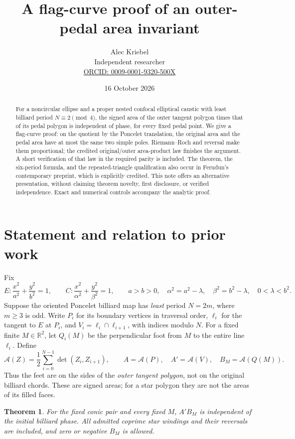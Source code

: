 \documentclass[11pt]{article}
\title{A flag-curve proof of an outer-pedal area invariant}
\author{Alec Kriebel\\
\small Independent researcher\\
\small \href{https://orcid.org/0009-0001-9320-500X}{ORCID: 0009-0001-9320-500X}}
\date{16 October 2026}
\newtheorem{theorem}{Theorem}
\newcommand{\area}{\mathcal A}
\newcommand{\RR}{\mathbb R}
\begin{document}
\maketitle
\begin{abstract}
For a noncircular ellipse and a proper nested confocal elliptical caustic with
least billiard period \(N\equiv2\pmod4\), the signed area of the outer tangent
polygon times that of its pedal polygon is independent of phase, for every
fixed pedal point. We give a flag-curve proof: on the quotient by the
Poncelet translation, the original area and the pedal area have at most the
same two simple poles. Riemann--Roch and reversal make them proportional;
the credited original/outer area-product law finishes the argument.
A short verification of that law in the required parity is included.
The theorem, the six-period formula, and the repeated-triangle qualification
also occur in Ferudun's contemporary preprint, which is explicitly credited.
This note offers an alternative presentation, without claiming theorem
novelty, first disclosure, or verified independence. Exact and numerical
controls accompany the analytic proof.
\end{abstract}

\section{Statement and relation to prior work}
Fix
\[
 E:\frac{x^2}{a^2}+\frac{y^2}{b^2}=1,\qquad
 C:\frac{x^2}{\alpha^2}+\frac{y^2}{\beta^2}=1,\qquad
 a>b>0,\quad \alpha^2=a^2-\lambda,\quad\beta^2=b^2-\lambda,\quad
 0<\lambda<b^2 .
\]
Suppose the oriented Poncelet billiard map has \emph{least} period
\(N=2m\), where \(m\geq3\) is odd. Write \(P_i\) for its boundary vertices
in traversal order, \(\ell_i\) for the tangent to \(E\) at \(P_i\), and
\(V_i=\ell_i\cap\ell_{i+1}\), with indices modulo \(N\).
For a fixed finite \(M\in\RR^2\), let \(Q_i(M)\) be the perpendicular foot
from \(M\) to the entire line \(\ell_i\). Define
\[
 \area(Z)=\frac12\sum_{i=0}^{N-1}\det(Z_i,Z_{i+1}),\qquad
 A=\area(P),\quad A'=\area(V),\quad B_M=\area(Q(M)).
\]
Thus the feet are on the sides of the \emph{outer tangent polygon},
not on the original billiard chords. These are signed areas; for a star
polygon they are not the areas of its filled faces.

\begin{theorem}\label{thm}
For the fixed conic pair and every fixed \(M\), \(A'B_M\) is independent
of the initial billiard phase. All admitted coprime star windings and
their reversals are included, and zero or negative \(B_M\) is allowed.
\end{theorem}
\end{document}

